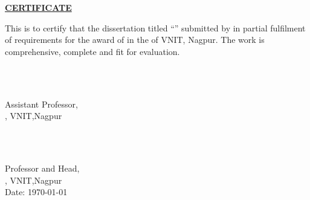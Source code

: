 \vspace{\baselineskip}




\begin{centering}
\textbf{\large{\underline{CERTIFICATE}}}\\
\end{centering}
This is to certify that the dissertation titled ``\textbf{\thesisTitle}'' submitted by  \textbf{\yourName} in partial fulfilment of requirements for the award of {\yourDegree} in the {\yourCourse}  of VNIT, Nagpur. The work is comprehensive, complete and fit for evaluation. \\[1.25cm]

\begin{minipage}{0.4\textwidth}
	\begin{flushleft} \large
		\emph{}\\[2cm] %
	\end{flushleft}
\end{minipage}
\begin{minipage}{0.7\textwidth}
	{\begin{center} 
		\textbf{\yourSupName}\\
			{Assistant Professor,\\ 
			\normalsize{\yourSchool, VNIT,Nagpur}}
	\end{center}}
\end{minipage}\\[1cm]

\begin{minipage}{0.75\textwidth}
	{\begin{center} 
		
		\begin{flushleft}
		\textbf{\yourHodName}\\
			{Professor and Head,\\
			 \normalsize{\yourSchool, VNIT,Nagpur}\\
			Date: {\today}}
		\end{flushleft}
	\end{center}}
\end{minipage}

    
    

    
    



